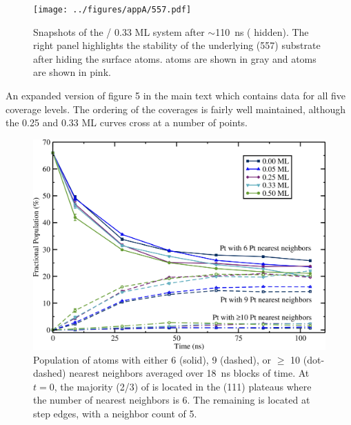 \begin{figure}
  \texttt{[image: ../figures/appA/557.pdf]}
  \caption{Snapshots of the / 0.33 ML system after
    $\sim$110~ns ( hidden). The right panel highlights the
    stability of the underlying (557)  substrate after hiding
    the surface  atoms.  atoms are shown in gray and
     atoms are shown in pink.}
\label{fig:557}
\end{figure}

\newpage

An expanded version of figure 5 in the main text which contains data
for all five  coverage levels.  The ordering of the coverages
is fairly well maintained, although the 0.25 and 0.33 ML curves cross
at a number of points.

\begin{figure}
\includegraphics[width=\linewidth]{../figures/appA/nearestNeighbor_full_withmorenn_photoshopped.pdf}
\caption{Population of  atoms with either 6 (solid), 9
  (dashed), or $\ge$ 10 (dot-dashed)  nearest neighbors
  averaged over 18~ns blocks of time.  At $t = 0$, the majority
  (2/3) of  is located in the (111) plateaus where
  the number of  nearest neighbors is 6. The remaining 
  is located at step edges, with a neighbor  count of 5.}
\label{fig:nn_full} 
\end{figure}





